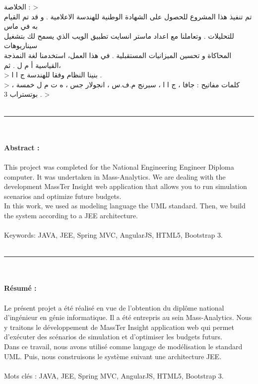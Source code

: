  \qquad \qquad \qquad \qquad \qquad \qquad \qquad \qquad \qquad \qquad \qquad \qquad \qquad \qquad \qquad \qquad \qquad \<الخلاصة : >     
\\
\< تم تنفيذ هذا المشروع للحصول على الشهادة الوطنية للهندسة الاعلامية . و قد تم القيام به في ماس \\للتحليلات . وتعاملنا مع اعداد ماستر انسايت تطبيق الويب الذي يسمح لك بتشغيل سيناريوهات \\المحاكاة و تحسين الميزانيات المستقبلية . في هذا العمل، استخدمنا لغة النمذجة القياسية أ م ل .  ثم،\\>
\qquad \qquad \qquad \qquad \qquad \qquad \qquad \qquad \qquad \qquad \qquad \qquad \qquad
\< بنينا النظام وفقا للهندسة ج ا ا .\\>
\<  كلمات مفاتيح :  جافا ، ج ا ا ، سبرنج م.ف.س ، انجولار جس ، ه ت م ل خمسة ، بوتستراب 3 . >
\\ 
\\
\noindent\rule{16cm}{0.4pt}
\\
\\
\textbf{Abstract :}
\\
\\
This project was completed for the National Engineering Engineer Diploma
computer. It was undertaken in Mass-Analytics. We are dealing with the development
MassTer Insight web application that allows you to run simulation scenarios and optimize future budgets.
\\
In this work, we used as modeling language the UML standard. Then,
we build the system according to a JEE architecture.
\\
\\
Keywords: JAVA, JEE, Spring MVC, AngularJS, HTML5, Bootstrap 3.
\\
\\
\noindent\rule{16cm}{0.4pt}
\\
\\
\textbf{Résumé :}
\\
\\
Le présent projet a été réalisé en vue de l’obtention du diplôme national d’ingénieur en génie 
informatique. Il a été entrepris au sein Mass-Analytics. Nous y traitons le développement
de MassTer Insight application web qui permet d'exécuter des scénarios de simulation et d'optimiser les budgets futurs.
\\
Dans ce travail, nous avons utilisé comme langage de modélisation le standard UML. Puis,
nous construisons le système suivant une architecture JEE.
\\
\\
Mots clés : JAVA, JEE, Spring MVC, AngularJS, HTML5, Bootstrap 3.